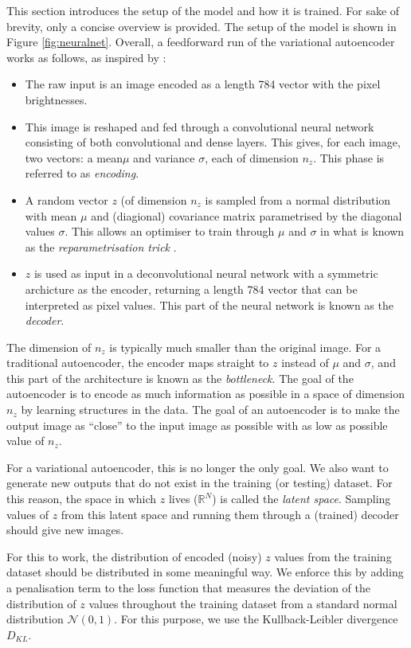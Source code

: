 \documentclass[]{article}
\begin{document}
This section introduces the setup of the model and how it is trained. For sake of brevity, only a concise overview is provided. The setup of the model is shown in Figure \ref{fig:neuralnet}. Overall, a feedforward run of the variational autoencoder works as follows, as inspired by \cite{notes, frans, altosaar, shafkat}: 
\begin{itemize}
\item The raw input is an image encoded as a length 784 vector with the pixel brightnesses. 
\item This image is reshaped and fed through a convolutional neural network consisting of both convolutional and dense layers. This gives, for each image, two vectors: a mean$\mu$ and variance $\sigma$, each of dimension $n_z$. This phase is referred to as \textit{encoding}.
\item A random vector $z$ (of dimension $n_z$ is sampled from a normal distribution with mean $\mu$ and (diagional) covariance matrix parametrised by the diagonal values $\sigma$. This allows an optimiser to train through $\mu$ and $\sigma$ in what is known as the \textit{reparametrisation trick} \cite{notes, frans}.
\item $z$ is used as input in a deconvolutional neural network with a symmetric archicture as the encoder, returning a length 784 vector that can be interpreted as pixel values. This part of the neural network is known as the \textit{decoder}. 
\end{itemize}

The dimension of $n_z$ is typically much smaller than the original image. For a traditional autoencoder, the encoder maps straight to $z$ instead of $\mu$ and $\sigma$, and this part of the architecture is known as the \textit{bottleneck}. The goal of the autoencoder is to encode as much information as possible in a space of dimension $n_z$ by learning structures in the data. The goal of an autoencoder is to make the output image as ``close'' to the input image as possible with as low as possible value of $n_z$.

For a variational autoencoder, this is no longer the only goal. We also want to generate new outputs that do not exist in the training (or testing) dataset. For this reason, the space in which $z$ lives ($\mathbb{R}^N$) is called the \textit{latent space}. Sampling values of $z$ from this latent space and running them through a (trained) decoder should give new images.

For this to work, the distribution of encoded (noisy) $z$ values from the training dataset should be distributed in some meaningful way. We enforce this by adding a penalisation term to the loss function that measures the deviation of the distribution of $z$ values throughout the training dataset from a standard normal distribution $\mathcal{N}(0, 1)$. For this purpose, we use the Kullback-Leibler divergence $D_{KL}$.
\end{document}
